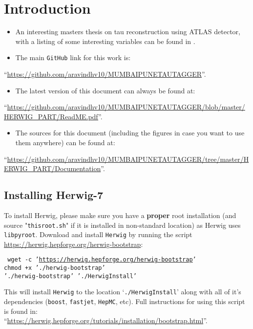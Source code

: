 \section{Introduction}

\begin{itemize}
    \item An interesting masters thesis on tau reconstruction using ATLAS detector, with a listing of some interesting variables can be found in \cite[Chapter-5]{Thesis}.
    
    \item The main {\tt GitHub} link for this work is:
\end{itemize}
\begin{flushleft}
    ``\small{\url{https://github.com/aravindhv10/MUMBAIPUNETAUTAGGER}}''.
\end{flushleft}

\begin{itemize}
    \item The latest version of this document can always be found at:
\end{itemize}
\begin{flushleft}
    ``\small{\url{https://github.com/aravindhv10/MUMBAIPUNETAUTAGGER/blob/master/HERWIG_PART/ReadME.pdf}}''.
\end{flushleft}

\begin{itemize}
    \item The sources for this document (including the figures in case you want to use them anywhere) can be found at:
\end{itemize}
\begin{flushleft}
    ``\small{\url{https://github.com/aravindhv10/MUMBAIPUNETAUTAGGER/tree/master/HERWIG_PART/Documentation}}''.
\end{flushleft}

\subsection{Installing Herwig-7}
To install Herwig, please make sure you have a {\bf proper} root installation (and source "{\tt thisroot.sh}" if it is installed in non-standard location) as Herwig uses {\tt libpyroot}.
Download and install {\tt Herwig} by running the script \url{https://herwig.hepforge.org/herwig-bootstrap}:
\begin{center}
    \begin{minipage}{0.7\textwidth}
        {\tt
            wget -c '\url{https://herwig.hepforge.org/herwig-bootstrap}'\\
            chmod +x './herwig-bootstrap'\\
            './herwig-bootstrap' './HerwigInstall'
        }
    \end{minipage}
\end{center}
This will install {\tt Herwig} to the location `{\tt ./HerwigInstall}' along with all of it's dependencies ({\tt boost}, {\tt fastjet}, {\tt HepMC}, etc).
Full instructions for using this script is found in:\\
``\small{\url{https://herwig.hepforge.org/tutorials/installation/bootstrap.html}}''.

